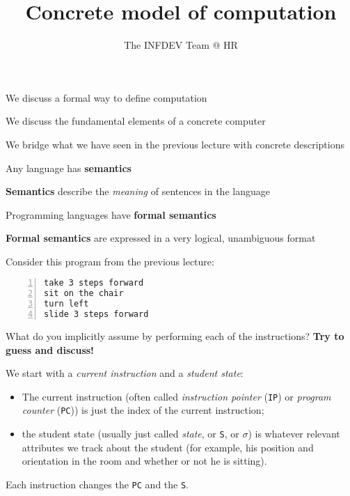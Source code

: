 \documentclass{beamer}
\title{Concrete model of computation}
\author{The INFDEV Team @ HR}
\institute{Hogeschool Rotterdam \\ 
Rotterdam, Netherlands}
\date{}
\begin{document}
\maketitle

\begin{slide}{
\item We discuss a formal way to define computation
\item We discuss the fundamental elements of a concrete computer
\item We bridge what we have seen in the previous lecture with concrete descriptions
}\end{slide}

\begin{slide}{
\item Any language has \textbf{semantics}
\item \textbf{Semantics} describe the \textit{meaning} of sentences in the language
\item Programming languages have \textbf{formal semantics}
\item \textbf{Formal semantics} are expressed in a very logical, unambiguous format
}\end{slide}

\begin{frame}[fragile]
Consider this program from the previous lecture:

\begin{lstlisting}[frame=shadowbox,numbers=left]
take 3 steps forward 
sit on the chair 
turn left 
slide 3 steps forward
\end{lstlisting}

What do you implicitly assume by performing each of the instructions? \textbf{Try to guess and discuss!}
\end{frame}

\begin{slide}{
\item We start with a \textit{current instruction} and a \textit{student state}:
\begin{itemize}
\item The current instruction (often called \textit{instruction pointer} (\texttt{IP}) or \textit{program counter} (\texttt{PC})) is just the index of the current instruction;
\item the student state (usually just called \textit{state}, or \texttt{S}, or $\sigma$) is whatever relevant attributes we track about the student (for example, his position and orientation in the room and whether or not he is sitting).
\end{itemize}
\item Each instruction changes the \texttt{PC} and the \texttt{S}.
}\end{slide}
\end{document}
